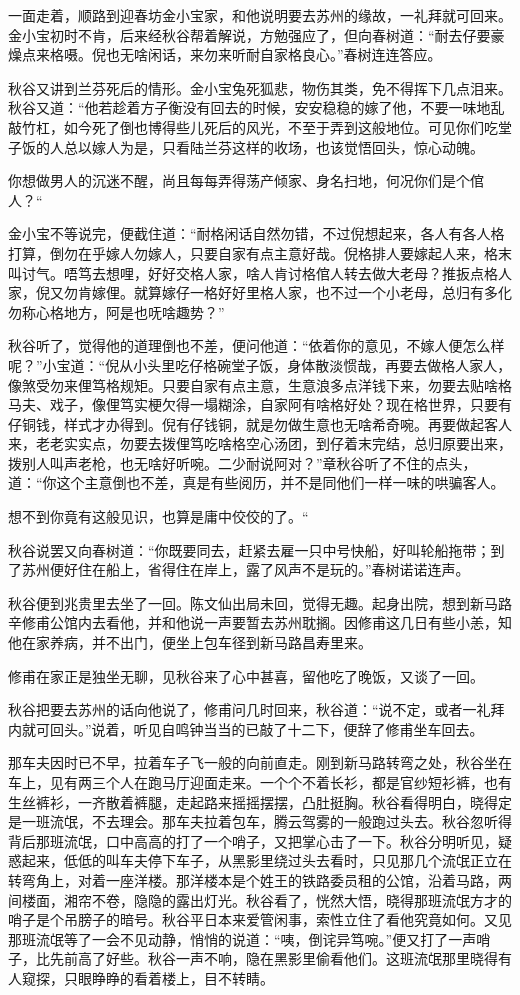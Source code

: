 \documentclass[12pt,UTF8]{ctexbook}
\begin{document}
{{{一面走着，顺路到迎春坊金小宝家，和他说明要去苏州的缘故，一礼拜就可回来。金小宝初时不肯，后来经秋谷帮着解说，方勉强应了，但向春树道：“耐去仔要豪燥点来格嗫。倪也无啥闲话，来勿来听耐自家格良心。”春树连连答应。

秋谷又讲到兰芬死后的情形。金小宝兔死狐悲，物伤其类，免不得挥下几点泪来。秋谷又道：“他若趁着方子衡没有回去的时候，安安稳稳的嫁了他，不要一味地乱敲竹杠，如今死了倒也博得些儿死后的风光，不至于弄到这般地位。可见你们吃堂子饭的人总以嫁人为是，只看陆兰芬这样的收场，也该觉悟回头，惊心动魄。

你想做男人的沉迷不醒，尚且每每弄得荡产倾家、身名扫地，何况你们是个倌人？“

金小宝不等说完，便截住道：“耐格闲话自然勿错，不过倪想起来，各人有各人格打算，倒勿在乎嫁人勿嫁人，只要自家有点主意好哉。倪格排人要嫁起人来，格末叫讨气。唔笃去想哩，好好交格人家，啥人肯讨格倌人转去做大老母？推扳点格人家，倪又勿肯嫁俚。就算嫁仔一格好好里格人家，也不过一个小老母，总归有多化勿称心格地方，阿是也呒啥趣势？”

秋谷听了，觉得他的道理倒也不差，便问他道：“依着你的意见，不嫁人便怎么样呢？”小宝道：“倪从小头里吃仔格碗堂子饭，身体散淡惯哉，再要去做格人家人，像煞受勿来俚笃格规矩。只要自家有点主意，生意浪多点洋钱下来，勿要去贴啥格马夫、戏子，像俚笃实梗欠得一塌糊涂，自家阿有啥格好处？现在格世界，只要有仔铜钱，样式才办得到。倪有仔钱铜，就是勿做生意也无啥希奇啘。再要做起客人来，老老实实点，勿要去拨俚笃吃啥格空心汤团，到仔着末完结，总归原要出来，拨别人叫声老枪，也无啥好听啘。二少耐说阿对？”章秋谷听了不住的点头，道：“你这个主意倒也不差，真是有些阅历，并不是同他们一样一味的哄骗客人。

想不到你竟有这般见识，也算是庸中佼佼的了。“

秋谷说罢又向春树道：“你既要同去，赶紧去雇一只中号快船，好叫轮船拖带；到了苏州便好住在船上，省得住在岸上，露了风声不是玩的。”春树诺诺连声。

秋谷便到兆贵里去坐了一回。陈文仙出局未回，觉得无趣。起身出院，想到新马路辛修甫公馆内去看他，并和他说一声要暂去苏州耽搁。因修甫这几日有些小恙，知他在家养病，并不出门，便坐上包车径到新马路昌寿里来。

修甫在家正是独坐无聊，见秋谷来了心中甚喜，留他吃了晚饭，又谈了一回。

秋谷把要去苏州的话向他说了，修甫问几时回来，秋谷道：“说不定，或者一礼拜内就可回头。”说着，听见自鸣钟当当的已敲了十二下，便辞了修甫坐车回去。

那车夫因时已不早，拉着车子飞一般的向前直走。刚到新马路转弯之处，秋谷坐在车上，见有两三个人在跑马厅迎面走来。一个个不着长衫，都是官纱短衫裤，也有生丝裤衫，一齐散着裤腿，走起路来摇摇摆摆，凸肚挺胸。秋谷看得明白，晓得定是一班流氓，不去理会。那车夫拉着包车，腾云驾雾的一般跑过头去。秋谷忽听得背后那班流氓，口中高高的打了一个哨子，又把掌心击了一下。秋谷分明听见，疑惑起来，低低的叫车夫停下车子，从黑影里绕过头去看时，只见那几个流氓正立在转弯角上，对着一座洋楼。那洋楼本是个姓王的铁路委员租的公馆，沿着马路，两间楼面，湘帘不卷，隐隐的露出灯光。秋谷看了，恍然大悟，晓得那班流氓方才的哨子是个吊膀子的暗号。秋谷平日本来爱管闲事，索性立住了看他究竟如何。又见那班流氓等了一会不见动静，悄悄的说道：“咦，倒诧异笃啘。”便又打了一声哨子，比先前高了好些。秋谷一声不响，隐在黑影里偷看他们。这班流氓那里晓得有人窥探，只眼睁睁的看着楼上，目不转睛。

}}}
\end{document}
